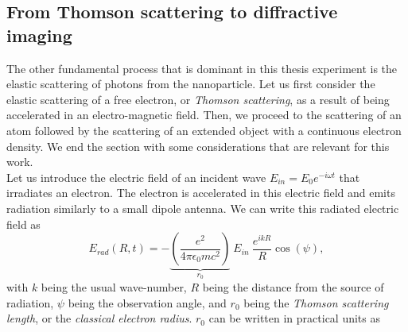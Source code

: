 \subsection{From Thomson scattering to diffractive imaging}\label{sec:saxs}
The other fundamental process that is dominant in this thesis experiment is the elastic scattering of photons from the nanoparticle. Let us first consider the elastic scattering of a free electron, or \textit{Thomson scattering}, as a result of being accelerated in an electro-magnetic field. Then, we proceed to the scattering of an atom followed by the scattering of an extended object with a continuous electron density. We end the section with some considerations that are relevant for this work.\\[1\baselineskip]
Let us introduce the electric field of an incident wave $E_{in}=E_{0}e^{-i\omega t}$ that irradiates an electron. The electron is accelerated in this electric field and emits radiation similarly to a small dipole antenna. We can write this radiated electric field as \citep{Als-Nielson-2011-JWS}
\begin{equation}
E_{rad}(R,t)=-\underbrace{\left(\frac{e^2}{4\pi \epsilon_0 m c^2}\right)}_{r_{0}}\ E_{in}\ \frac{e^{i k R}}{R} \cos\left(\psi\right),
\label{eq:radiated-by-electron}
\end{equation}
with $k$ being the usual wave-number, $R$ being the distance from the source of radiation, $\psi$ being the observation angle, and $r_0$ being the \textit{Thomson scattering length}, or the \textit{classical electron radius}. $r_0$ can be written in practical units as
